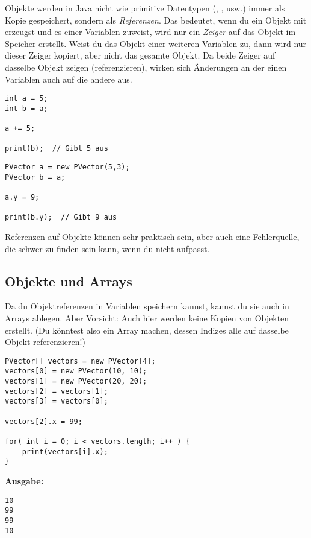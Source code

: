 \documentclass[9pt, a4paper]{arbeitsblatt}
\begin{document}
\ReiheTitel

Objekte werden in Java nicht wie primitive Datentypen (, , usw.) immer als Kopie gespeichert, sondern als \emph{Referenzen}. Das bedeutet, wenn du ein Objekt mit  erzeugst und es einer Variablen zuweist, wird nur ein \emph{Zeiger} auf das Objekt im Speicher erstellt. Weist du das Objekt einer weiteren Variablen zu, dann wird nur dieser Zeiger kopiert, aber nicht das gesamte Objekt. Da beide Zeiger auf dasselbe Objekt zeigen (referenzieren), wirken sich Änderungen an der einen Variablen auch auf die andere aus.

\begin{links}
\begin{verbatim}
int a = 5;
int b = a;

a += 5;

print(b);  // Gibt 5 aus
\end{verbatim}
\end{links}\begin{rechts}
\begin{verbatim}
PVector a = new PVector(5,3);
PVector b = a;

a.y = 9;

print(b.y);  // Gibt 9 aus
\end{verbatim}
\end{rechts}

Referenzen auf Objekte können sehr praktisch sein, aber auch eine Fehlerquelle, die schwer zu finden sein kann, wenn du nicht aufpasst.

\subsection*{Objekte und Arrays}

Da du Objektreferenzen in Variablen speichern kannst, kannst du sie auch in Arrays ablegen. Aber Vorsicht: Auch hier werden keine Kopien von Objekten erstellt. (Du könntest also ein Array machen, dessen Indizes alle auf dasselbe Objekt referenzieren!)

\begin{links}[.65]
\begin{verbatim}
PVector[] vectors = new PVector[4];
vectors[0] = new PVector(10, 10);
vectors[1] = new PVector(20, 20);
vectors[2] = vectors[1];
vectors[3] = vectors[0];

vectors[2].x = 99;

for( int i = 0; i < vectors.length; i++ ) {
	print(vectors[i].x);
}
\end{verbatim}
\end{links}\begin{rechts}[.3]
\vspace*{1em}\textbf{Ausgabe:}
\begin{verbatim}
10
99
99
10
\end{verbatim}
\end{rechts}
\end{document}
